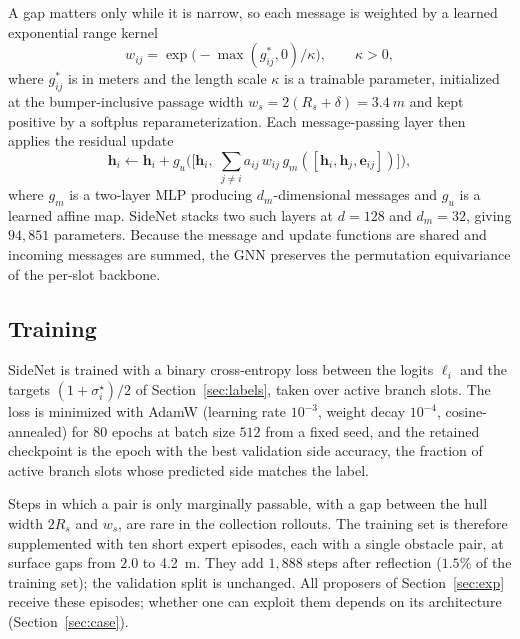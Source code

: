\documentclass{article}
\theoremstyle{definition}
\begin{document}
A gap matters only while it is narrow, so each message is weighted by a learned exponential range kernel
\begin{equation}
w_{ij}=\exp\!\big(-\max(g^*_{ij},0)/\kappa\big),\qquad \kappa>0,
\label{eq:kernel}
\end{equation}
where $g^*_{ij}$ is in meters and the length scale $\kappa$ is a trainable parameter, initialized at the bumper-inclusive passage width
$w_s=2(R_s+\delta)=\SI{3.4}{m}$ and kept positive by a softplus
reparameterization. Each message-passing layer then applies the residual
update
\begin{equation}
\mathbf{h}_i\leftarrow \mathbf{h}_i+g_u\Big(\big[\mathbf{h}_i,\;
\textstyle\sum_{j\neq i}a_{ij}\,w_{ij}\,g_m([\mathbf{h}_i,\mathbf{h}_j,
\mathbf{e}_{ij}])\big]\Big),
\label{eq:mp}
\end{equation}
where $g_m$ is a two-layer MLP producing $d_m$-dimensional messages and $g_u$
is a learned affine map. SideNet stacks two such layers at $d=128$ and
$d_m=32$, giving $94{,}851$ parameters. Because the message and update
functions are shared and incoming messages are summed, the GNN preserves the permutation equivariance of the per-slot backbone.

\subsection{\texorpdfstring{Training}{Training}}
\label{sec:train}

SideNet is trained with a binary cross-entropy loss between the logits $\ell_i$ and the targets $(1+\sigma^\star_i)/2$ of Section~\ref{sec:labels}, taken over active branch slots. The loss is minimized with AdamW (learning rate
$10^{-3}$, weight decay $10^{-4}$, cosine-annealed) for $80$ epochs at batch size
$512$ from a fixed seed, and the retained checkpoint is the epoch with the best
validation side accuracy, the fraction of active branch slots whose predicted
side matches the label.

Steps in which a pair is only marginally passable, with a gap between the hull width $2R_s$ and $w_s$, are rare in the collection rollouts. The training set is therefore supplemented with ten short expert episodes, each with a single obstacle pair, at surface gaps from $2.0$ to \SI{4.2}{m}. They add $1{,}888$ steps after reflection ($1.5\%$ of the training set); the validation split is unchanged. All proposers of Section~\ref{sec:exp} receive these episodes; whether one can exploit them depends on its architecture (Section~\ref{sec:case}).
\end{document}
